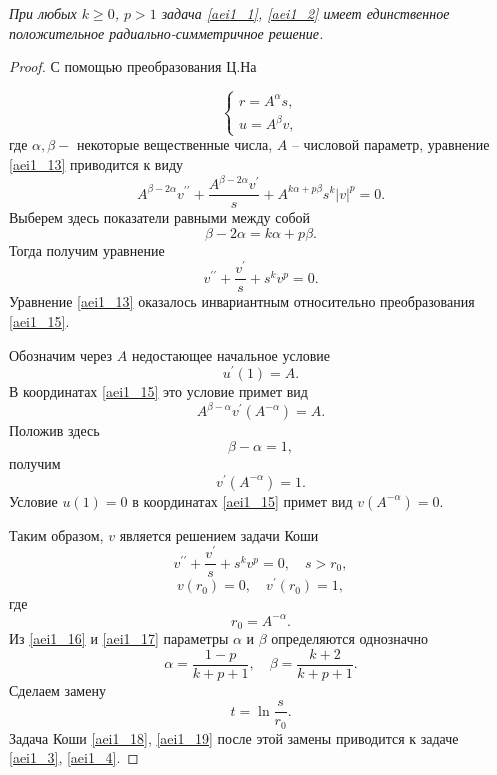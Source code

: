 \begin{theorem}
\textit{ При любых $ k \geq 0$, $p>1 $ задача \eqref{aei1_1}, \eqref{aei1_2} имеет
единственное положительное радиально-симметричное решение.}
\end{theorem}

\begin{proof}
С помощью преобразования Ц.На \cite{aeiL_14}

\begin{equation}\label{aei1_15}
\left \{
\begin{array}{l}
 r =A^{\alpha}s, \\
 u =A^{\beta}v,
\end{array} \right.
\end{equation}
где $ \alpha,\beta- $ некоторые вещественные числа, $ A$  -- числовой
параметр, уравнение \eqref{aei1_13} приводится к виду
$$
A^{\beta-2\alpha}v^{\prime\prime}+\frac{A^{\beta-2\alpha}v^{\prime}}{s}+A^{k\alpha+p\beta}s^k|v|^p=0.
$$
Выберем здесь показатели   равными между собой
\begin{equation}\label{aei1_16}
\beta-2\alpha=k\alpha+p\beta.
\end{equation}
Тогда получим уравнение
$$
v^{\prime\prime}+\frac{v^{\prime}}{s}+s^kv^p=0.
$$
Уравнение \eqref{aei1_13} оказалось инвариантным относительно преобразования
\eqref{aei1_15}.

Обозначим через $ A $  недостающее начальное условие
$$
u^{\prime}(1)=A.
$$
В координатах \eqref{aei1_15} это условие примет вид
$$
A^{\beta-\alpha}v^{\prime}(A^{-\alpha})=A.
$$
Положив здесь
\begin{equation}\label{aei1_17}
\beta-\alpha=1,
\end{equation}
получим
$$
v^{\prime}(A^{-\alpha})=1.
$$
Условие $ u(1)=0 $ в координатах \eqref{aei1_15}  примет вид $
v(A^{-\alpha})=0$.

Таким образом, $ v $  является решением задачи Коши
\begin{equation}\label{aei1_18}
v^{\prime\prime}+\frac{v^{\prime}}{s}+s^kv^p=0, \quad s>r_0,
\end{equation}
\begin{equation}\label{aei1_19}
v(r_0)=0, \quad v^{\prime}(r_0)=1,
\end{equation}
где
\begin{equation}\label{aei1_20}
r_0=A^{-\alpha}. 
\end{equation}
Из \eqref{aei1_16} и \eqref{aei1_17} параметры $\alpha $   и $ \beta $  определяются однозначно
$$
\alpha=\frac{1-p}{k+p+1}, \quad \beta=\frac{k+2}{k+p+1}.
$$
Сделаем замену
\begin{equation}\label{aei1_21}
t=\ln{\frac{s}{r_0}}. 
\end{equation}
Задача Коши \eqref{aei1_18}, \eqref{aei1_19} после этой замены приводится к задаче \eqref{aei1_3},
\eqref{aei1_4}.


\end{proof}
